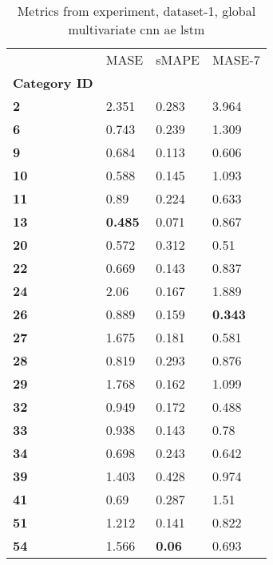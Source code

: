 \begin{table}[H]
\centering
\caption{Metrics from experiment, dataset-1, global multivariate cnn ae lstm}
\label{table:global-multivariate-cnn-ae-lstm-dataset-1}
\begin{tabular}{llll}
\toprule
{} &            MASE &          sMAPE &          MASE-7 \\
\textbf{Category ID} &                 &                &                 \\
\midrule
\textbf{2          } &           2.351 &          0.283 &           3.964 \\
\textbf{6          } &           0.743 &          0.239 &           1.309 \\
\textbf{9          } &           0.684 &          0.113 &           0.606 \\
\textbf{10         } &           0.588 &          0.145 &           1.093 \\
\textbf{11         } &            0.89 &          0.224 &           0.633 \\
\textbf{13         } &  \textbf{0.485} &          0.071 &           0.867 \\
\textbf{20         } &           0.572 &          0.312 &            0.51 \\
\textbf{22         } &           0.669 &          0.143 &           0.837 \\
\textbf{24         } &            2.06 &          0.167 &           1.889 \\
\textbf{26         } &           0.889 &          0.159 &  \textbf{0.343} \\
\textbf{27         } &           1.675 &          0.181 &           0.581 \\
\textbf{28         } &           0.819 &          0.293 &           0.876 \\
\textbf{29         } &           1.768 &          0.162 &           1.099 \\
\textbf{32         } &           0.949 &          0.172 &           0.488 \\
\textbf{33         } &           0.938 &          0.143 &            0.78 \\
\textbf{34         } &           0.698 &          0.243 &           0.642 \\
\textbf{39         } &           1.403 &          0.428 &           0.974 \\
\textbf{41         } &            0.69 &          0.287 &            1.51 \\
\textbf{51         } &           1.212 &          0.141 &           0.822 \\
\textbf{54         } &           1.566 &  \textbf{0.06} &           0.693 \\
\bottomrule
\end{tabular}
\end{table}
